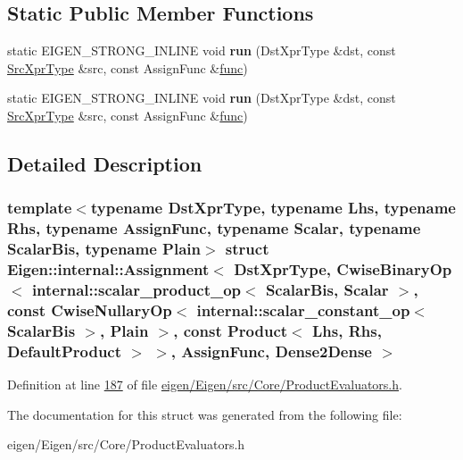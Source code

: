 \subsection*{Static Public Member Functions}
\begin{DoxyCompactItemize}
\item 
\mbox{\label{struct_eigen_1_1internal_1_1_assignment_3_01_dst_xpr_type_00_01_cwise_binary_op_3_01internal_1_1eb29cc77263dc530639098c389efc225_a26c4bececb04fddf315034d1a4250f30}} 
static E\+I\+G\+E\+N\+\_\+\+S\+T\+R\+O\+N\+G\+\_\+\+I\+N\+L\+I\+NE void {\bfseries run} (Dst\+Xpr\+Type \&dst, const \hyperlink{group___core___module_class_eigen_1_1_cwise_binary_op}{Src\+Xpr\+Type} \&src, const Assign\+Func \&\hyperlink{structfunc}{func})
\item 
\mbox{\label{struct_eigen_1_1internal_1_1_assignment_3_01_dst_xpr_type_00_01_cwise_binary_op_3_01internal_1_1eb29cc77263dc530639098c389efc225_a26c4bececb04fddf315034d1a4250f30}} 
static E\+I\+G\+E\+N\+\_\+\+S\+T\+R\+O\+N\+G\+\_\+\+I\+N\+L\+I\+NE void {\bfseries run} (Dst\+Xpr\+Type \&dst, const \hyperlink{group___core___module_class_eigen_1_1_cwise_binary_op}{Src\+Xpr\+Type} \&src, const Assign\+Func \&\hyperlink{structfunc}{func})
\end{DoxyCompactItemize}


\subsection{Detailed Description}
\subsubsection*{template$<$typename Dst\+Xpr\+Type, typename Lhs, typename Rhs, typename Assign\+Func, typename Scalar, typename Scalar\+Bis, typename Plain$>$\newline
struct Eigen\+::internal\+::\+Assignment$<$ Dst\+Xpr\+Type, Cwise\+Binary\+Op$<$ internal\+::scalar\+\_\+product\+\_\+op$<$ Scalar\+Bis, Scalar $>$, const Cwise\+Nullary\+Op$<$ internal\+::scalar\+\_\+constant\+\_\+op$<$ Scalar\+Bis $>$, Plain $>$, const Product$<$ Lhs, Rhs, Default\+Product $>$ $>$, Assign\+Func, Dense2\+Dense $>$}



Definition at line \hyperlink{eigen_2_eigen_2src_2_core_2_product_evaluators_8h_source_l00187}{187} of file \hyperlink{eigen_2_eigen_2src_2_core_2_product_evaluators_8h_source}{eigen/\+Eigen/src/\+Core/\+Product\+Evaluators.\+h}.



The documentation for this struct was generated from the following file\+:\begin{DoxyCompactItemize}
\item 
eigen/\+Eigen/src/\+Core/\+Product\+Evaluators.\+h\end{DoxyCompactItemize}
